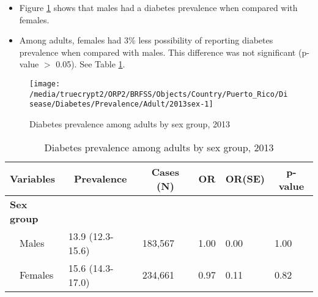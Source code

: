 \newpage
\begin{itemize}

\item Figure \ref{fig:sex.Diabetes.2013} shows that males had a 
diabetes prevalence when compared with females.


\item Among adults, females had 3\% less possibility of reporting diabetes prevalence when compared with males. This difference was not significant (p-value $>$ 0.05). See Table \ref{tab:sex.Diabetes.2013}.

\end{itemize}

\begin{figure}[H]
\caption{Diabetes prevalence among adults by sex group, 
2013}
\begin{knitrout}
\color{fgcolor}

{\centering \texttt{[image: /media/truecrypt2/ORP2/BRFSS/Objects/Country/Puerto\_Rico/Disease/Diabetes/Prevalence/Adult/2013sex-1]} 

}



\end{knitrout}
\label{fig:sex.Diabetes.2013}
\end{figure}

\begin{table}[H]
\caption{Diabetes prevalence  among adults by sex group, 2013\label{tab:sex.Diabetes.2013}} 
\begin{center}
\begin{tabular}{llllll}
\hline\hline
\multicolumn{1}{l}{Variables}&\multicolumn{1}{c}{Prevalence}&\multicolumn{1}{c}{Cases (N)}&\multicolumn{1}{c}{OR}&\multicolumn{1}{c}{OR(SE)}&\multicolumn{1}{c}{p-value}\tabularnewline
\hline
{\bfseries Sex group}&&&&&\tabularnewline
~~Males&13.9 (12.3-15.6)&183,567&1.00&0.00&1.00\tabularnewline
~~Females&15.6 (14.3-17.0)&234,661&0.97&0.11&0.82\tabularnewline
\hline
\end{tabular}\end{center}

\end{table}


